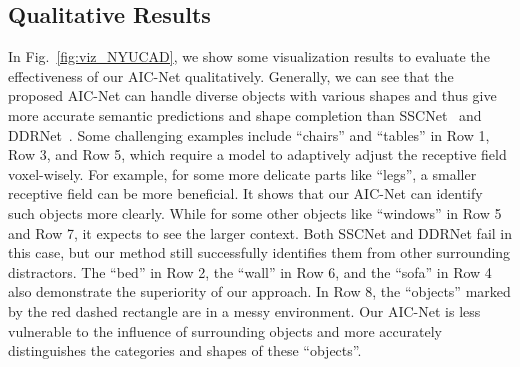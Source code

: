 \subsection{Qualitative Results}
\vspace{-0.1cm}
In Fig.~\ref{fig:viz_NYUCAD}, we show some visualization results to evaluate the effectiveness of our AIC-Net qualitatively.
Generally, we can see that the proposed AIC-Net can handle diverse objects with various shapes and thus give more accurate semantic predictions and shape completion than SSCNet~\cite{song2017_SSCNet} and DDRNet~\cite{li2019rgbd}.   
Some challenging examples include ``chairs'' and ``tables'' in Row 1, Row 3, and Row 5, which require a model to adaptively adjust the receptive field voxel-wisely. For example, for some more delicate parts like ``legs'', a smaller receptive field can be more beneficial. 
It shows that our AIC-Net can identify such objects more clearly.
While for some other objects like ``windows'' in Row 5 and Row 7, it expects to see the larger context. Both SSCNet and DDRNet fail in this case, but our method still successfully identifies them from other surrounding distractors. 
The ``bed'' in Row 2, the ``wall'' in Row 6, and the ``sofa'' in Row 4 also demonstrate the superiority of our approach.
In Row 8, the ``objects'' marked by the red dashed rectangle are in a messy environment. Our AIC-Net is less vulnerable to the influence of surrounding objects and more accurately distinguishes the categories and shapes of these ``objects''.


